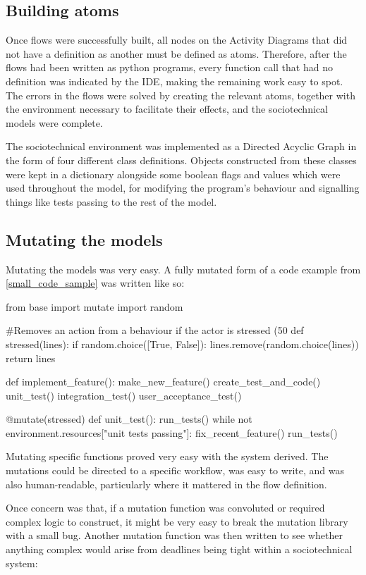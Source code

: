 \subsection{Building atoms}
Once flows were successfully built, all nodes on the Activity Diagrams that did not have a definition as another must be defined as atoms. Therefore, after the flows had been written as python programs, every function call that had no definition was indicated by the IDE, making the remaining work easy to spot. The errors in the flows were solved by creating the relevant atoms, together with the environment necessary to facilitate their effects, and the sociotechnical models were complete. \par
The sociotechnical environment was implemented as a Directed Acyclic Graph in the form of four different class definitions. Objects constructed from these classes were kept in a dictionary alongside some boolean flags and values which were used throughout the model, for modifying the program's behaviour and signalling things like tests passing to the rest of the model. \par

\subsection{Mutating the models}
Mutating the models was very easy. A fully mutated form of a code example from \cref{small_code_sample} was written like so:

\begin{pyglist}[language = python, encoding = utf8]
from base import mutate
import random

#Removes an action from a behaviour if the actor is stressed (50%
def stressed(lines):
    if random.choice([True, False]):
        lines.remove(random.choice(lines))
    return lines
    

def implement_feature():
    make_new_feature()
    create_test_and_code()
    unit_test()
    integration_test()
    user_acceptance_test()

@mutate(stressed)
def unit_test():
    run_tests()
    while not environment.resources["unit tests passing"]:
        fix_recent_feature()
        run_tests()
\end{pyglist}\par
Mutating specific functions proved very easy with the system derived. The mutations could be directed to a specific workflow, was easy to write, and was also human-readable, particularly where it mattered in the flow definition.\par
Once concern was that, if a mutation function was convoluted or required complex logic to construct, it might be very easy to break the mutation library with a small bug. Another mutation function was then written to see whether anything complex would arise from deadlines being tight within a sociotechnical system:

